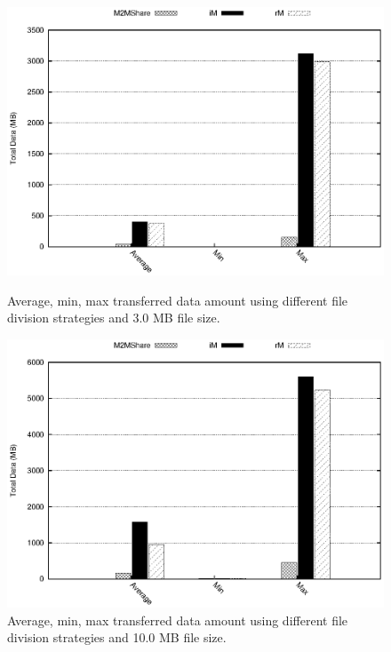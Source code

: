 \begin{figure}[ht]
\begin{minipage}[b]{0.5\linewidth}
\centering
\includegraphics[scale=0.5]{grafici/dataDFS_3MB.eps}
\caption{Average, min, max transferred data amount using different file division strategies and 3.0 MB file size.}
\label{graficoDataFDS_3MB}
\end{minipage}
\hspace{0.5cm}
\begin{minipage}[b]{0.5\linewidth}
\centering
\includegraphics[scale=0.5]{grafici/dataDFS_10MB.eps}
\caption{Average, min, max transferred data amount using different file division strategies and 10.0 MB file size.}
\label{graficoDataFDS_10MB}
\end{minipage}
\hspace{0.5cm}

\end{figure}
